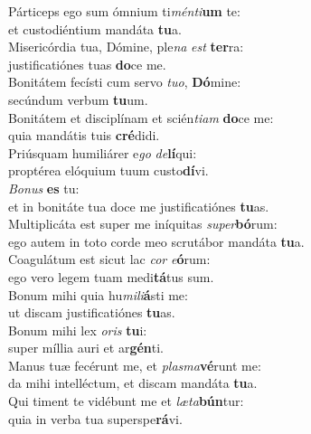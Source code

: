 \oddverse Párticeps ego sum ómnium ti\textit{mén}\textit{ti}\textbf{um} te:~\*\\
\oddverse et custodiéntium mandáta \textbf{tu}a.\\
\evenverse Misericórdia tua, Dómine, ple\textit{na} \textit{est} \textbf{ter}ra:~\*\\
\evenverse justificatiónes tuas \textbf{do}ce me.\\
\oddverse Bonitátem fecísti cum servo \textit{tu}\textit{o}, \textbf{Dó}mine:~\*\\
\oddverse secúndum verbum \textbf{tu}um.\\
\evenverse Bonitátem et disciplínam et scién\textit{ti}\textit{am} \textbf{do}ce me:~\*\\
\evenverse quia mandátis tuis \textbf{cré}didi.\\
\oddverse Priúsquam humiliárer e\textit{go} \textit{de}\textbf{lí}qui:~\*\\
\oddverse proptérea elóquium tuum custo\textbf{dí}vi.\\
\evenverse \textit{Bo}\textit{nus} \textbf{es} tu:~\*\\
\evenverse et in bonitáte tua doce me justificatiónes \textbf{tu}as.\\
\oddverse Multiplicáta est super me iníquitas \textit{su}\textit{per}\textbf{bó}rum:~\*\\
\oddverse ego autem in toto corde meo scrutábor mandáta \textbf{tu}a.\\
\evenverse Coagulátum est sicut lac \textit{cor} \textit{e}\textbf{ó}rum:~\*\\
\evenverse ego vero legem tuam medi\textbf{tá}tus sum.\\
\oddverse Bonum mihi quia hu\textit{mi}\textit{li}\textbf{á}sti me:~\*\\
\oddverse ut discam justificatiónes \textbf{tu}as.\\
\evenverse Bonum mihi lex \textit{o}\textit{ris} \textbf{tu}i:~\*\\
\evenverse super míllia auri et ar\textbf{gén}ti.\\
\oddverse Manus tuæ fecérunt me, et \textit{plas}\textit{ma}\textbf{vé}runt me:~\*\\
\oddverse da mihi intelléctum, et discam mandáta \textbf{tu}a.\\
\evenverse Qui timent te vidébunt me et \textit{læ}\textit{ta}\textbf{bún}tur:~\*\\
\evenverse quia in verba tua superspe\textbf{rá}vi.\\
